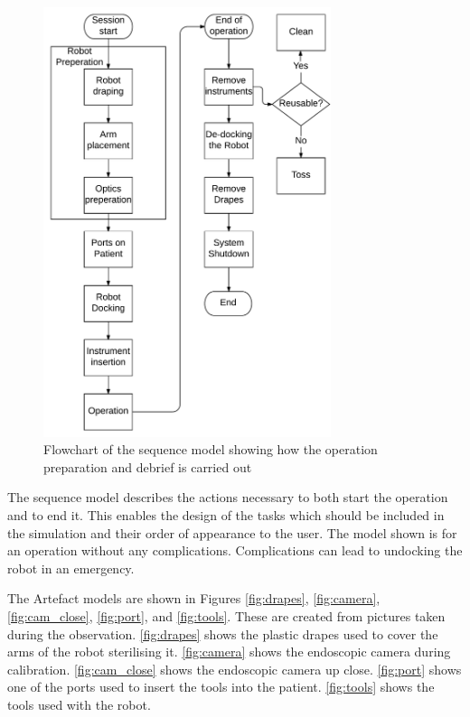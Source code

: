 \begin{figure}[hbpt]
	\centering
	\includegraphics[width=0.75\textwidth]{FieldStudies/figures/sequencemodel}
	\caption{Flowchart of the sequence model showing how the operation preparation and debrief is carried out}
	\label{fig:sequence}
\end{figure}

The sequence model describes the actions necessary to both start the operation and to end it. This enables the design of the tasks which should be included in the simulation and their order of appearance to the user.
The model shown is for an operation without any complications. Complications can lead to undocking the robot in an emergency.


The Artefact models are shown in Figures \ref{fig:drapes}, \ref{fig:camera}, \ref{fig:cam_close}, \ref{fig:port}, and \ref{fig:tools}. These are created from pictures taken during the observation. \autoref{fig:drapes} shows the plastic drapes used to cover the arms of the robot sterilising it. \autoref{fig:camera} shows the endoscopic camera during calibration. \autoref{fig:cam_close} shows the endoscopic camera up close. \autoref{fig:port} shows one of the ports used to insert the tools into the patient. \autoref{fig:tools} shows the tools used with the robot.


